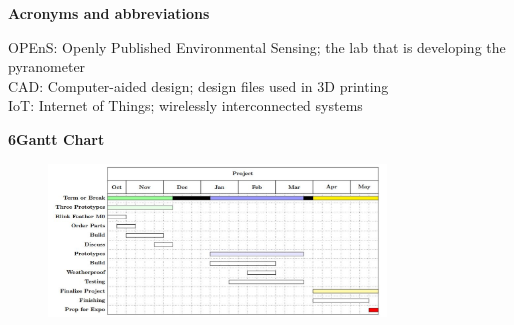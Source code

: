 \documentclass[10pt,draftclsnofoot,onecolumn,letterpaper]{article}
\begin{document}
{\fontsize{10pt}{12.0pt} \textbf{Acronyms and abbreviations}\\\selectfont 
\par}\par
{\fontsize{10pt}{12.0pt} OPEnS: Openly Published Environmental Sensing; the lab that is developing the pyranometer\\CAD: Computer-aided design; design files used in 3D printing\\IoT: Internet of Things; wirelessly interconnected systems\\\selectfont 
\par}\par

\pagebreak

{\fontsize{12pt}{12.0pt} \textbf{6\quad Gantt Chart}\\\selectfont 
\par}\par

\begin{figure}[h]
    \centering
    \includegraphics[width=0.8\textwidth,natwidth=610, natheight=642]{ganttchart.JPG}
\end{figure}
\end{document}
